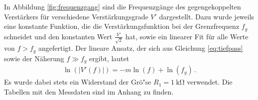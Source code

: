 \documentclass[]{scrartcl}
\begin{document}
In Abbildung \ref{fig:frequenzgang} sind die Frequenzgänge des gegengekoppelten Verstärkers für verschiedene Verstärkungsgrade $V'$ dargestellt. Dazu wurde jeweils eine konstante Funktion, die die Verstärkungsfunktion bei der Grenzfrequenz $f_g$ schneidet und den konstanten Wert $\frac{V'}{\sqrt{2}}$ hat, sowie ein linearer Fit für alle Werte von $f>f_g$ angefertigt. Der lineare Ansatz, der sich aus Gleichung \ref{eq:tiefpass} sowie der Näherung $f \gg f_g$ ergibt, lautet
\begin{align}
\ln(|V'(f)|)=-m\ln(f)+\ln(f_g)\,.
\end{align} 
Es wurde dabei stets ein Widerstand der Grö"se $R_1=\SI{1}{\kilo\ohm}$ verwendet. Die Tabellen mit den Messdaten sind im Anhang zu finden.
\newpage
\noindent{} \\
\end{document}
